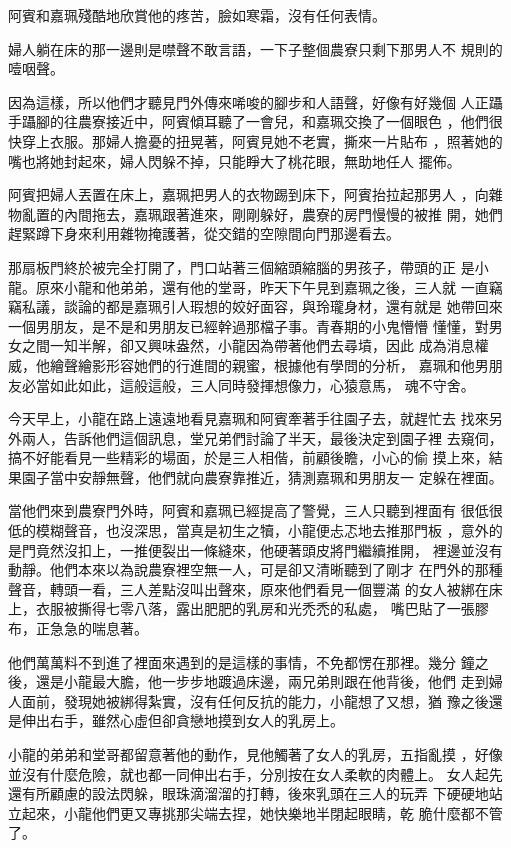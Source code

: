 阿賓和嘉珮殘酷地欣賞他的疼苦，臉如寒霜，沒有任何表情。

婦人躺在床的那一邊則是噤聲不敢言語，一下子整個農寮只剩下那男人不
規則的噎咽聲。

因為這樣，所以他們才聽見門外傳來唏唆的腳步和人語聲，好像有好幾個
人正躡手躡腳的往農寮接近中，阿賓傾耳聽了一會兒，和嘉珮交換了一個眼色
，他們很快穿上衣服。那婦人擔憂的扭晃著，阿賓見她不老實，撕來一片貼布
，照著她的嘴也將她封起來，婦人閃躲不掉，只能睜大了桃花眼，無助地任人
擺佈。

阿賓把婦人丟置在床上，嘉珮把男人的衣物踢到床下，阿賓抬拉起那男人
，向雜物亂置的內間拖去，嘉珮跟著進來，剛剛躲好，農寮的房門慢慢的被推
開，她們趕緊蹲下身來利用雜物掩護著，從交錯的空隙間向門那邊看去。

那扇板門終於被完全打開了，門口站著三個縮頭縮腦的男孩子，帶頭的正
是小龍。原來小龍和他弟弟，還有他的堂哥，昨天下午見到嘉珮之後，三人就
一直竊竊私議，談論的都是嘉珮引人瑕想的姣好面容，與玲瓏身材，還有就是
她帶回來一個男朋友，是不是和男朋友已經幹過那檔子事。青春期的小鬼懵懵
懂懂，對男女之間一知半解，卻又興味盎然，小龍因為帶著他們去尋墳，因此
成為消息權威，他繪聲繪影形容她們的行進間的親蜜，根據他有學問的分析，
嘉珮和他男朋友必當如此如此，這般這般，三人同時發揮想像力，心猿意馬，
魂不守舍。

今天早上，小龍在路上遠遠地看見嘉珮和阿賓牽著手往園子去，就趕忙去
找來另外兩人，告訴他們這個訊息，堂兄弟們討論了半天，最後決定到園子裡
去窺伺，搞不好能看見一些精彩的場面，於是三人相偕，前顧後瞻，小心的偷
摸上來，結果園子當中安靜無聲，他們就向農寮靠推近，猜測嘉珮和男朋友一
定躲在裡面。

當他們來到農寮門外時，阿賓和嘉珮已經提高了警覺，三人只聽到裡面有
很低很低的模糊聲音，也沒深思，當真是初生之犢，小龍便忐忑地去推那門板
，意外的是門竟然沒扣上，一推便裂出一條縫來，他硬著頭皮將門繼續推開，
裡邊並沒有動靜。他們本來以為說農寮裡空無一人，可是卻又清晰聽到了剛才
在門外的那種聲音，轉頭一看，三人差點沒叫出聲來，原來他們看見一個豐滿
的女人被綁在床上，衣服被撕得七零八落，露出肥肥的乳房和光禿禿的私處，
嘴巴貼了一張膠布，正急急的喘息著。

他們萬萬料不到進了裡面來遇到的是這樣的事情，不免都愣在那裡。幾分
鐘之後，還是小龍最大膽，他一步步地踱過床邊，兩兄弟則跟在他背後，他們
走到婦人面前，發現她被綁得紮實，沒有任何反抗的能力，小龍想了又想，猶
豫之後還是伸出右手，雖然心虛但卻貪戀地摸到女人的乳房上。

小龍的弟弟和堂哥都留意著他的動作，見他觸著了女人的乳房，五指亂摸
，好像並沒有什麼危險，就也都一同伸出右手，分別按在女人柔軟的肉體上。
女人起先還有所顧慮的設法閃躲，眼珠滴溜溜的打轉，後來乳頭在三人的玩弄
下硬硬地站立起來，小龍他們更又專挑那尖端去捏，她快樂地半閉起眼睛，乾
脆什麼都不管了。

